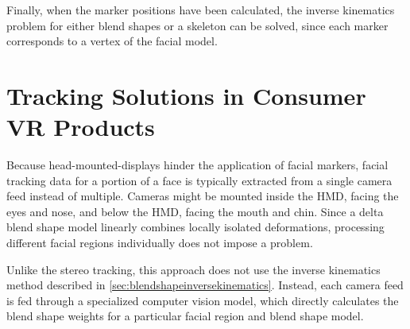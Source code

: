 Finally, when the marker positions have been calculated,
the inverse kinematics problem for either blend shapes or a skeleton can be solved,
since each marker corresponds to a vertex of the facial model.

\section{Tracking Solutions in Consumer VR Products}
\label{sec:consumertrackingsolutions}

Because head-mounted-displays hinder the application of facial markers,
facial tracking data for a portion of a face is typically extracted from a single camera feed instead of multiple.
Cameras might be mounted inside the HMD, facing the eyes and nose, and below the HMD, facing the mouth and chin.
Since a delta blend shape model linearly combines locally isolated deformations,
processing different facial regions individually does not impose a problem.

Unlike the stereo tracking, this approach does not use the inverse kinematics method described in \autoref{sec:blendshapeinversekinematics}.
Instead, each camera feed is fed through a specialized computer vision model,
which directly calculates the blend shape weights for a particular facial region and blend shape model.
